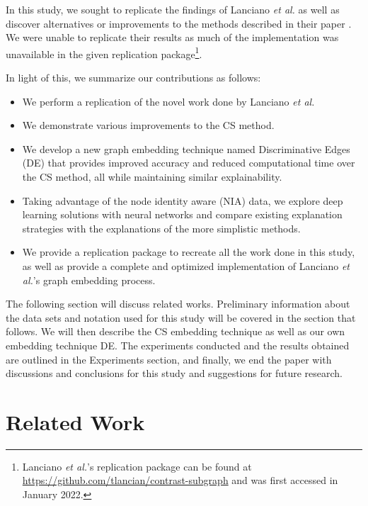 \documentclass[letterpaper]{article}
\begin{document}
In this study, we sought to replicate the findings of Lanciano \emph{et al.} as well as discover alternatives or improvements to the methods described in their paper \cite{lanciano2020}.
We were unable to replicate their results as much of the implementation was unavailable in the given replication package\footnote{Lanciano \emph{et al.}'s replication package can be found at \url{https://github.com/tlancian/contrast-subgraph} and was first accessed in January 2022.}.

In light of this, we summarize our contributions as follows:

\begin{itemize}
    \item We perform a replication of the novel work done by Lanciano \emph{et al.}
    \item We demonstrate various improvements to the CS method.
    \item We develop a new graph embedding technique named Discriminative Edges (DE) that provides improved accuracy and reduced computational time over the CS method, all while maintaining similar explainability.
    \item Taking advantage of the node identity aware (NIA) data, we explore deep learning solutions with neural networks and compare existing explanation strategies with the explanations of the more simplistic methods.
    \item We provide a replication package to recreate all the work done in this study, as well as provide a complete and optimized implementation of Lanciano \emph{et al.}'s graph embedding process.
\end{itemize}

The following section will discuss related works.
Preliminary information about the data sets and notation used for this study will be covered in the section that follows.
We will then describe the CS embedding technique as well as our own embedding technique DE.
The experiments conducted and the results obtained are outlined in the Experiments section, and finally, we end the paper with discussions and conclusions for this study and suggestions for future research.



\section{Related Work}

\end{document}
